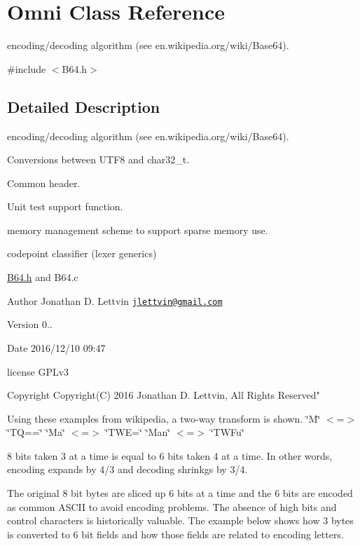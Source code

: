\hypertarget{class_omni}{}\section{Omni Class Reference}
\label{class_omni}


encoding/decoding algorithm (see en.\+wikipedia.\+org/wiki/\+Base64).  




{\ttfamily \#include $<$B64.\+h$>$}



\subsection{Detailed Description}
encoding/decoding algorithm (see en.\+wikipedia.\+org/wiki/\+Base64). 

Conversions between U\+T\+F8 and char32\+\_\+t.

Common header.

Unit test support function.

memory management scheme to support sparse memory use.

codepoint classifier (lexer generics)

\hyperlink{_b64_8h_source}{B64.\+h} and B64.\+c

\begin{DoxyAuthor}{Author}
Jonathan D. Lettvin \href{mailto:jlettvin@gmail.com}{\tt jlettvin@gmail.\+com}
\end{DoxyAuthor}
\begin{DoxyVersion}{Version}
0..
\end{DoxyVersion}
\begin{DoxyDate}{Date}
2016/12/10 09\+:47
\end{DoxyDate}
license G\+P\+Lv3

\begin{DoxyCopyright}{Copyright}
Copyright(\+C) 2016 Jonathan D. Lettvin, All Rights Reserved"
\end{DoxyCopyright}
Using these examples from wikipedia, a two-\/way transform is shown. \char`\"{}\+M\char`\"{} $<$=$>$ \char`\"{}\+T\+Q==\char`\"{} \char`\"{}\+Ma\char`\"{} $<$=$>$ \char`\"{}\+T\+W\+E=\char`\"{} \char`\"{}\+Man\char`\"{} $<$=$>$ \char`\"{}\+T\+W\+Fu\char`\"{}

8 bits taken 3 at a time is equal to 6 bits taken 4 at a time. In other words, encoding expands by 4/3 and decoding shrinkgs by 3/4.

The original 8 bit bytes are sliced up 6 bits at a time and the 6 bits are encoded as common A\+S\+C\+II to avoid encoding problems. The absence of high bits and control characters is historically valuable. The example below shows how 3 bytes is converted to 6 bit fields and how those fields are related to encoding letters.

